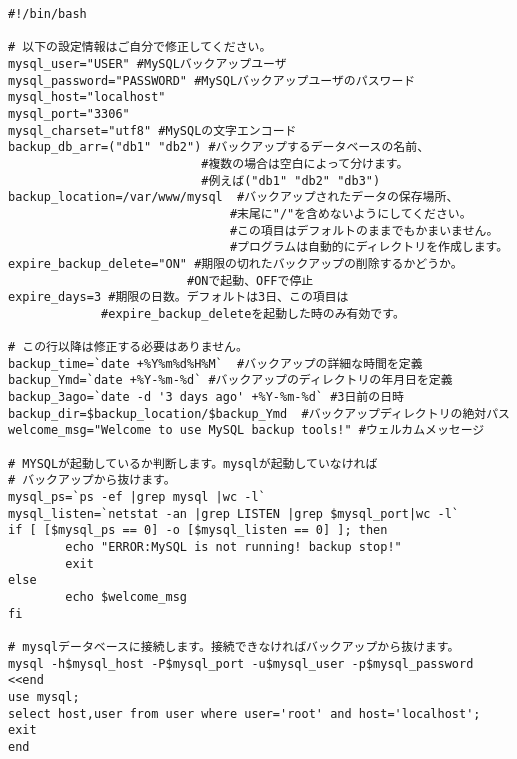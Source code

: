 \begin{lstlisting}[numbers=none]
#!/bin/bash

# 以下の設定情報はご自分で修正してください。
mysql_user="USER" #MySQLバックアップユーザ
mysql_password="PASSWORD" #MySQLバックアップユーザのパスワード
mysql_host="localhost"
mysql_port="3306"
mysql_charset="utf8" #MySQLの文字エンコード
backup_db_arr=("db1" "db2") #バックアップするデータベースの名前、
                           #複数の場合は空白によって分けます。
                           #例えば("db1" "db2" "db3")
backup_location=/var/www/mysql  #バックアップされたデータの保存場所、
                               #末尾に"/"を含めないようにしてください。
                               #この項目はデフォルトのままでもかまいません。
                               #プログラムは自動的にディレクトリを作成します。
expire_backup_delete="ON" #期限の切れたバックアップの削除するかどうか。
                         #ONで起動、OFFで停止
expire_days=3 #期限の日数。デフォルトは3日、この項目は
             #expire_backup_deleteを起動した時のみ有効です。

# この行以降は修正する必要はありません。
backup_time=`date +%Y%m%d%H%M`  #バックアップの詳細な時間を定義
backup_Ymd=`date +%Y-%m-%d` #バックアップのディレクトリの年月日を定義
backup_3ago=`date -d '3 days ago' +%Y-%m-%d` #3日前の日時
backup_dir=$backup_location/$backup_Ymd  #バックアップディレクトリの絶対パス
welcome_msg="Welcome to use MySQL backup tools!" #ウェルカムメッセージ

# MYSQLが起動しているか判断します。mysqlが起動していなければ
# バックアップから抜けます。
mysql_ps=`ps -ef |grep mysql |wc -l`
mysql_listen=`netstat -an |grep LISTEN |grep $mysql_port|wc -l`
if [ [$mysql_ps == 0] -o [$mysql_listen == 0] ]; then
        echo "ERROR:MySQL is not running! backup stop!"
        exit
else
        echo $welcome_msg
fi

# mysqlデータベースに接続します。接続できなければバックアップから抜けます。
mysql -h$mysql_host -P$mysql_port -u$mysql_user -p$mysql_password <<end
use mysql;
select host,user from user where user='root' and host='localhost';
exit
end


\end{lstlisting}
